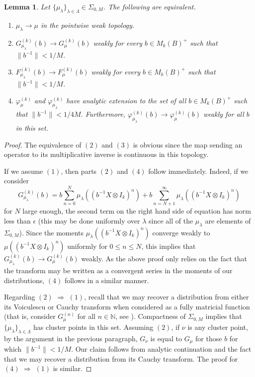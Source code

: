 \documentclass[11pt]{amsart}
\newtheorem{lemma}[theorem]{Lemma}
\begin{document}
 

\begin{lemma}\label{convergence_lemma}
Let $\{ \mu_{\lambda} \}_{\lambda \in \Lambda} \in \Sigma_{0,M}$.  The following are equivalent.

\begin{enumerate}
 \item $\mu_{\lambda} \rightarrow \mu$ in the pointwise weak topology.

\item $G^{(k)}_{\mu_{\lambda}}(b) \rightarrow G^{(k)}_{\mu}(b)$ weakly for every $b\in M_{k}(B)^{+}$ such that $\|b^{-1} \| < 1/M$.

\item $F^{(k)}_{\mu_{\lambda}}(b) \rightarrow F^{(k)}_{\mu}(b)$ weakly for every $b\in M_{k}(B)^{+}$ such that $\|b^{-1} \| < 1/M$.

\item $\varphi_{\mu}^{(k)}$ and $\varphi^{(k)}_{\mu_{\lambda}}$ have analytic extension to the set of all $b\in M_{k}(B)^{+}$ such that $\|b^{-1} \| < 1/4M$.  
Furthermore, $\varphi_{\mu_{\lambda}}^{(k)}(b) \rightarrow \varphi_{\mu}^{(k)}(b)$ weakly for all $b$ in this set.
\end{enumerate}

\end{lemma}

\begin{proof}
The equivalence of $(2)$ and $(3)$ is obvious since the map sending an operator to its multiplicative inverse is continuous in this topology.

If we assume $(1)$, then parts $(2)$ and $(4)$ follow immediately.  Indeed, if we consider 
$$G_{\mu_{\lambda}}^{(k)}(b) = b\sum_{n=0}^{N}\mu_{\lambda}((b^{-1}X\otimes I_{k})^{n}) + b\sum_{n=N+1}^{\infty}\mu_{\lambda}((b^{-1}X\otimes I_{k})^{n})$$
for $N$ large enough, the second term on the right hand side of equation has norm less than $\epsilon$ (this may be done uniformly over $\lambda$ since all of the $\mu_{\lambda}$ are
elements of $\Sigma_{0,M}$).  Since the moments $\mu_{\lambda}((b^{-1}X\otimes I_{k})^{n})$ converge weakly to $\mu((b^{-1}X\otimes I_{k})^{n})$ uniformly for
$0 \leq n \leq N$, this implies that $G^{(k)}_{\mu_{\lambda}}(b) \rightarrow G^{(k)}_{\mu}(b)$ weakly.  As the above proof only relies on the fact that the transform
may be written as a convergent series in the moments of our distributions, $(4)$ follows in a similar manner.

Regarding $(2)$  $\Rightarrow$ $(1)$, recall that we may recover a distribution from either its Voiculescu or Cauchy transform when considered as a
fully matricial function (that is, consider $G_{\mu}^{(n)}$ for all $n\in \mathbb{N}$, see \cite{vo5}).
Compactness of $\Sigma_{0,M}$ implies that $\{\mu_{\lambda} \}_{\lambda \in \Lambda}$ has cluster points in this set.
  Assuming $(2)$, if $\nu$ is any cluster point, by the argument in
the previous paragraph, $G_{\nu}$ is equal to $G_{\mu}$ for those $b$ for which $\|b^{-1} \|< 1/M$.  Our claim follows from analytic continuation and the fact
that we may recover a distribution from its Cauchy transform.
The proof for $(4)$ $\Rightarrow$ $(1)$ is similar.
\end{proof}
\end{document}

